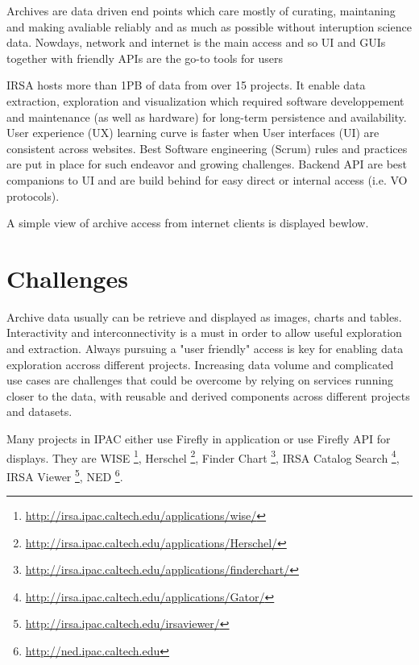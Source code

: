 \documentclass[11pt,twoside]{article}
\begin{document}
Archives are data driven end points which care mostly of curating, maintaning and making avaliable reliably and as much as possible without interuption science data.
Nowdays, network and internet is the main access and so UI and GUIs together with friendly APIs are the go-to tools for users

IRSA hosts more than 1PB of data from over 15 projects. It enable data extraction, exploration and visualization which required software developpement and maintenance (as well as hardware) for long-term persistence and availability.
User experience (UX) learning curve is faster when User interfaces (UI) are consistent across websites.
Best Software engineering (Scrum) rules and practices are put in place for such endeavor and growing challenges.
Backend API are best companions to UI and are build behind for easy direct or internal access (i.e. VO protocols).

A simple view of archive access from internet clients is displayed bewlow.




\section{Challenges}

Archive data usually can be retrieve and displayed as images, charts and tables.
Interactivity and interconnectivity is a must in order to allow useful exploration and extraction.
Always pursuing a "user friendly" access is key for enabling data exploration accross different projects.
Increasing data volume and complicated use cases are challenges that could be overcome by relying on services running closer to the data, with
reusable and derived components across different projects and datasets.

Many projects in IPAC either  use Firefly  in application or use Firefly API for displays.
They are WISE \footnote{\url{http://irsa.ipac.caltech.edu/applications/wise/}},
Herschel \footnote{\url{http://irsa.ipac.caltech.edu/applications/Herschel/}}, 
Finder Chart \footnote{\url{http://irsa.ipac.caltech.edu/applications/finderchart/}}, 
IRSA Catalog Search \footnote{\url{http://irsa.ipac.caltech.edu/applications/Gator/}}, 
IRSA Viewer \footnote{\url{http://irsa.ipac.caltech.edu/irsaviewer/}}, 
NED \footnote{\url{http://ned.ipac.caltech.edu}}. 
\end{document}
